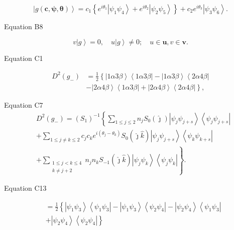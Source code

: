 \documentclass[aps]{revtex4}%
\begin{document}
\[
\left\vert g\left(  \boldsymbol{c},\boldsymbol{\psi},\boldsymbol{\theta
}\right)  \right\rangle =c_{1}\left\{  e^{i\theta_{1}}\left\vert \psi_{1}%
\psi_{4}\right\rangle +e^{i\theta_{2}}\left\vert \psi_{2}\psi_{5}\right\rangle
\right\}  +c_{2}e^{i\theta_{3}}\left\vert \psi_{3}\psi_{6}\right\rangle .
\]


Equation B8%

\[
v\left\vert g\right\rangle =0,\quad u\left\vert g\right\rangle \neq0;\quad
u\in\boldsymbol{u},v\in\boldsymbol{v.}%
\]


Equation C1%

\begin{align*}
D^{2}\left(  g_{-}\right)   &  =\frac{1}{2}\left\{  \left\vert 1\alpha
3\beta\right\rangle \left\langle 1\alpha3\beta\right\vert -\left\vert
1\alpha3\beta\right\rangle \left\langle 2\alpha4\beta\right\vert \right. \\
&  -\left.  \left\vert 2\alpha4\beta\right\rangle \left\langle 1\alpha
3\beta\right\vert +\left\vert 2\alpha4\beta\right\rangle \left\langle
2\alpha4\beta\right\vert \right\}  ,
\end{align*}


Equation C7%
\begin{align*}
&  D^{2}\left(  g_{-}\right)  =\left(  S_{1}\right)  ^{-1}\left\{  \sum_{1\leq
j\leq2}n_{j}S_{0}\left(  \hat{\jmath}\right)  \left\vert \psi_{j}\psi
_{j+s}\right\rangle \left\langle \psi_{j}\psi_{j+s}\right\vert \right. \\
&  +\sum_{1\leq j\neq k\leq2}c_{j}c_{k}e^{i\left(  \theta_{j}-\theta
_{k}\right)  }S_{0}\left(  \hat{\jmath}\hat{k}\right)  \left\vert \psi_{j}%
\psi_{j+s}\right\rangle \left\langle \psi_{k}\psi_{k+s}\right\vert \\
&  \left.  +\sum_{\substack{1\leq j<k\leq4\\k\neq j+2}}n_{j}n_{k}S_{-1}\left(
\hat{\jmath}\hat{k}\right)  \left\vert \psi_{j}\psi_{k}\right\rangle
\left\langle \psi_{j}\psi_{k}\right\vert \right\}  .
\end{align*}


Equation C13%

\begin{align*}
&  =\frac{1}{2}\left\{  \left\vert \psi_{1}\psi_{3}\right\rangle \left\langle
\psi_{1}\psi_{3}\right\vert -\left\vert \psi_{1}\psi_{3}\right\rangle
\left\langle \psi_{2}\psi_{4}\right\vert -\left\vert \psi_{2}\psi
_{4}\right\rangle \left\langle \psi_{1}\psi_{3}\right\vert \right. \\
&  +\left.  \left\vert \psi_{2}\psi_{4}\right\rangle \left\langle \psi_{2}%
\psi_{4}\right\vert \right\}
\end{align*}
\end{document}
